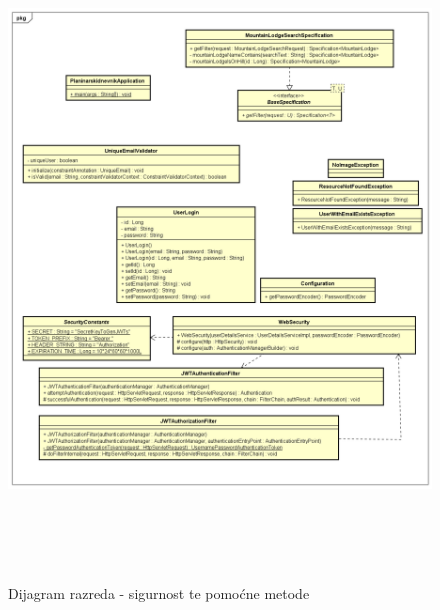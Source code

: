 		
			\begin{figure}[H]
				\includegraphics[scale=0.6, height=175mm, width=165mm]{dijagrami/helpers-class.png} %
				\centering
				\caption{Dijagram razreda - sigurnost te pomoćne metode}
				\label{fig:dijagrami_razreda5}
			\end{figure}
			
			\eject
			
			
			
			
			\eject
		
			
			
			
